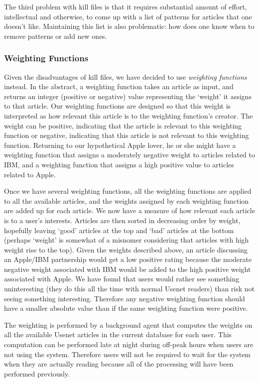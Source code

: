 The third problem with kill files is that it requires substantial amount of
effort, intellectual and otherwise, to come up with a list of patterns for
articles that one doesn't like. Maintaining this list is also problematic: how 
does one know when to remove patterns or add new ones.

\subsubsection{Weighting Functions}

Given the disadvantages of kill files, we have decided to use {\em weighting
functions} instead. In the abstract, a weighting function takes an article as
input, and returns an integer (positive or negative) value representing the
`weight' it assigns to that article. Our weighting functions are designed so
that this weight is interpreted as how relevant this article is to the
weighting function's creator. The weight can be positive, indicating that the
article is relevant to this weighting function or negative, indicating that
this article is not relevant to this weighting function. Returning to our
hypothetical Apple lover, he or she might have a weighting function that
assigns a moderately negative weight to articles related to IBM, and a
weighting function that assigns a high positive value to articles related to
Apple.

Once we have several weighting functions, all the weighting functions are
applied to all the available articles, and the weights assigned by each
weighting function are added up for each article. We now have a measure of how
relevant each article is to a user's interests. Articles are then sorted in
decreasing order by weight, hopefully leaving `good' articles at the top and
`bad' articles at the bottom (perhaps `weight' is somewhat of a misnomer
considering that articles with high weight rise to the top). Given the weights
described above, an article discussing an Apple/IBM partnership would get a low
positive rating because the moderate negative weight associated with IBM would
be added to the high positive weight associated with Apple. We have found that
users would rather see something uninteresting (they do this all the time with
normal Usenet readers) than risk not seeing something interesting. Therefore
any negative weighting function should have a smaller absolute value than if
the same weighting function were positive.

The weighting is performed by a background agent that computes the weights on
all the available Usenet articles in the current database for each user.  This
computation can be performed late at night during off-peak hours when users are
not using the system. Therefore users will not be required to wait for the
system when they are actually reading because all of the processing will have
been performed previously.

